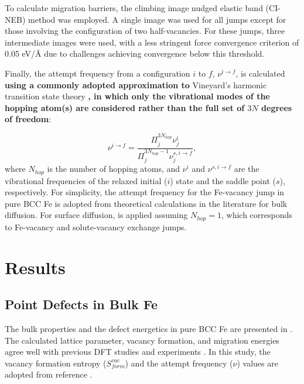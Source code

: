 \documentclass[preprint,12pt]{elsarticle}
\providecommand{\DIFaddtex}[1]{{\bf #1}} %
\providecommand{\DIFdeltex}[1]{} %
\providecommand{\DIFaddbegin}{\protect\color{blue}} %
\providecommand{\DIFaddend}{\protect\color{black}} %
\providecommand{\DIFdelbegin}{\protect\color{red}} %
\providecommand{\DIFdelend}{\protect\color{black}} %
\providecommand{\DIFadd}[1]{\texorpdfstring{\DIFaddtex{#1}}{#1}} %
\providecommand{\DIFdel}[1]{\texorpdfstring{\DIFdeltex{#1}}{}} %
\newcommand{\DIFscaledelfig}{0.5}
\newlength{\DIFdelgraphicswidth} %
\newlength{\DIFdelgraphicsheight} %
\newcommand{\DIFaddincludegraphics}[2][]{{\color{blue}\fbox{\DIFOincludegraphics[#1]{#2}}}} %
\newcommand{\DIFdelincludegraphics}[2][]{%
\sbox{\DIFdelgraphicsbox}{\DIFOincludegraphics[#1]{#2}}%
\settoboxwidth{\DIFdelgraphicswidth}{\DIFdelgraphicsbox} %
\settoboxtotalheight{\DIFdelgraphicsheight}{\DIFdelgraphicsbox} %
\scalebox{\DIFscaledelfig}{%
\parbox[b]{\DIFdelgraphicswidth}{\usebox{\DIFdelgraphicsbox}\\[-\baselineskip] \rule{\DIFdelgraphicswidth}{0em}}\llap{\resizebox{\DIFdelgraphicswidth}{\DIFdelgraphicsheight}{%
\setlength{\unitlength}{\DIFdelgraphicswidth}%
\begin{picture}(1,1)%
\thicklines\linethickness{2pt} %
{\color[rgb]{1,0,0}\put(0,0){\framebox(1,1){}}}%
{\color[rgb]{1,0,0}\put(0,0){\line( 1,1){1}}}%
{\color[rgb]{1,0,0}\put(0,1){\line(1,-1){1}}}%
\end{picture}%
}\hspace*{3pt}}} %
} %
\DeclareRobustCommand{\DIFaddbegin}{\DIFOaddbegin \let\includegraphics\DIFaddincludegraphics} %
\DeclareRobustCommand{\DIFaddend}{\DIFOaddend \let\includegraphics\DIFOincludegraphics} %
\DeclareRobustCommand{\DIFdelbegin}{\DIFOdelbegin \let\includegraphics\DIFdelincludegraphics} %
\DeclareRobustCommand{\DIFdelend}{\DIFOaddend \let\includegraphics\DIFOincludegraphics} %
\begin{document}
To calculate migration barriers, the climbing image nudged elastic band (CI-NEB) method \cite{henkelman_climbing_2000} was employed. A single image was used for all jumps except for those involving the configuration of two half-vacancies. For these jumps, three intermediate images were used, with a less stringent force convergence criterion of 0.05 eV/{\AA} due to challenges achieving convergence below this threshold.


Finally, the attempt frequency from a configuration $i$ to $f$, $\nu^{i\rightarrow f}$, is calculated \DIFdelbegin \DIFdel{by an approximate form of }\DIFdelend \DIFaddbegin \DIFadd{using a commonly adopted approximation to }\DIFaddend Vineyard's harmonic transition state theory \cite{vineyard_frequency_1957}\DIFdelbegin \DIFdel{as follows}\DIFdelend \DIFaddbegin \DIFadd{, in which only the vibrational modes of the hopping atom(s) are considered rather than the full set of $3N$ degrees of freedom}\DIFaddend :

\begin{equation}
    \label{eq:attempt_freq}
    \nu^{i\rightarrow f} = \frac{\Pi^{3N_{hop}}_j  \nu^{i}_j}{\Pi^{3N_{hop}-1}_j  \nu^{s,i\rightarrow f}_j},
\end{equation}
where $N_{hop}$ is the number of hopping atoms, and $\nu^{i}$ and $\nu^{s,i\rightarrow f}$ are the vibrational frequencies of the relaxed initial ($i$) state and the saddle point ($s$), respectively. For simplicity, the attempt frequency for the Fe-vacancy jump in pure BCC Fe is adopted from theoretical calculations in the literature \cite{messina_systematic_2016} for bulk diffusion. For surface diffusion,  is applied
assuming $N_{hop}=1$, which corresponds to Fe-vacancy and solute-vacancy exchange jumps.


\FloatBarrier
\section{Results}

\subsection{Point Defects in Bulk Fe}

\noindent The bulk properties and the defect energetics in pure BCC Fe are presented in . The calculated lattice parameter, vacancy formation, and migration energies agree well with previous DFT studies \cite{messina_exact_2014, murali_bcc_fe_2015, yang_significant_2023, Li_magnetic_2021, choudhury2011ab} and experiments \cite{kittel2018introduction, schepper_positron1983, tapasa2007computer}. In this study, the vacancy formation entropy ($S_{form}^{vac}$) and the attempt frequency ($\nu$) values are adopted from reference \cite{messina_systematic_2016}. 
\end{document}
